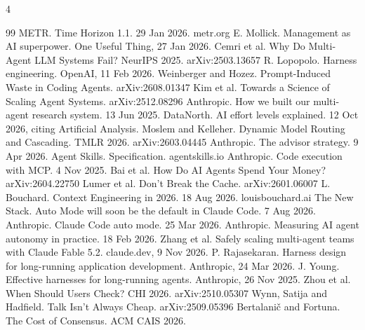 \documentclass[11pt,letterpaper]{article}
\newcommand{\boxlabel}[1]{{\sffamily\footnotesize\bfseries\color{ink2} #1}}
\begin{document}
\vspace{0.3em}
\noindent\boxlabel{REFERENCES}\par\vspace{-0.6em}
\begin{multicols}{4}
{\fontsize{6.6}{8}\selectfont\raggedright\sffamily\renewcommand{\section}[2]{}
\begin{thebibliography}{99}
\setlength{\itemsep}{0pt}\setlength{\parskip}{0pt}\setlength{\labelsep}{2pt}
 METR. Time Horizon 1.1. 29 Jan 2026. metr.org
 E. Mollick. Management as AI superpower. One Useful Thing, 27 Jan 2026.
 Cemri et al. Why Do Multi-Agent LLM Systems Fail? NeurIPS 2025. arXiv:2503.13657
 R. Lopopolo. Harness engineering. OpenAI, 11 Feb 2026.
 Weinberger and Hozez. Prompt-Induced Waste in Coding Agents. arXiv:2608.01347
 Kim et al. Towards a Science of Scaling Agent Systems. arXiv:2512.08296
 Anthropic. How we built our multi-agent research system. 13 Jun 2025.
 DataNorth. AI effort levels explained. 12 Oct 2026, citing Artificial Analysis.
 Moslem and Kelleher. Dynamic Model Routing and Cascading. TMLR 2026. arXiv:2603.04445
 Anthropic. The advisor strategy. 9 Apr 2026.
 Agent Skills. Specification. agentskills.io
 Anthropic. Code execution with MCP. 4 Nov 2025.
 Bai et al. How Do AI Agents Spend Your Money? arXiv:2604.22750
 Lumer et al. Don't Break the Cache. arXiv:2601.06007
 L. Bouchard. Context Engineering in 2026. 18 Aug 2026. louisbouchard.ai
 The New Stack. Auto Mode will soon be the default in Claude Code. 7 Aug 2026.
 Anthropic. Claude Code auto mode. 25 Mar 2026.
 Anthropic. Measuring AI agent autonomy in practice. 18 Feb 2026.
 Zhang et al. Safely scaling multi-agent teams with Claude Fable 5.2. claude.dev, 9 Nov 2026.
 P. Rajasekaran. Harness design for long-running application development. Anthropic, 24 Mar 2026.
 J. Young. Effective harnesses for long-running agents. Anthropic, 26 Nov 2025.
 Zhou et al. When Should Users Check? CHI 2026. arXiv:2510.05307
 Wynn, Satija and Hadfield. Talk Isn't Always Cheap. arXiv:2509.05396
 Bertalani\v{c} and Fortuna. The Cost of Consensus. ACM CAIS 2026.

\end{thebibliography}}
\end{multicols}
\end{document}
